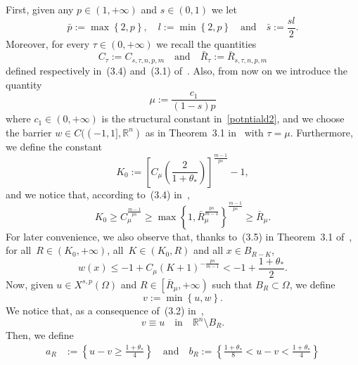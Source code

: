 \documentclass[12pt]{article}
\newcommand{\R}{\mathbb{R}}
\numberwithin{equation}{section}
\renewcommand{\leq}{\leqslant}
\renewcommand{\geq}{\geqslant}
\begin{document}
First, given any $p\in (1,+\infty)$ and $s\in (0,1)$ we let
\begin{equation}\label{holeo}
\bar{p}:=\max\left\lbrace 2,p \right\rbrace,\quad l:=\min\left\lbrace 2,p \right\rbrace\quad\mbox{and}\quad \bar{s}:=\frac{sl}{2}.
\end{equation}
Moreover, for every $\tau\in (0,+\infty)$ we recall the quantities 
\begin{equation}\label{latuse-invefr43}
C_\tau:=C_{s,\tau,n,p,m}\quad\mbox{and}\quad \bar{R}_{\tau}:=\bar{R}_{s,\tau,n,p,m}
\end{equation} 
defined respectively in~(3.4) and~(3.1) of~\cite{DFVERPP}. Also, from now on we introduce the quantity 
\begin{equation}\label{muuuuuuu}
\mu:=\frac{c_1}{(1-s)p}
\end{equation} 
where $c_1\in (0,+\infty)$ is the structural constant in~\eqref{potntiald2}, and we choose the barrier $w\in C((-1,1],\R^n)$ as in Theorem~3.1 in~\cite{DFVERPP} with $\tau=\mu$. Furthermore, we define the constant 
\begin{equation*}
K_0:=\left[C_\mu\left(\frac{2}{1+\theta_*}\right)\right]^{\frac{m-1}{ps}}-1, 
\end{equation*} 
and we notice that, according to~(3.4) in~\cite{DFVERPP},
\begin{equation}\label{KpgrdiR}
K_0\geq C_\mu^\frac{m-1}{ps}\geq \max\left\lbrace 1, \bar{R}_\mu^{\frac{ps}{m-1}}\right\rbrace^\frac{m-1}{ps}\geq \bar{R}_\mu.
\end{equation}
For later convenience, we also observe that, thanks to~(3.5) in Theorem~3.1 of~\cite{DFVERPP}, for all~$R\in(K_0,+\infty)$, all~$K\in (K_0,R)$ and all $x\in B_{R-K}$,
\begin{equation}\label{ukulele}
w(x)\leq -1+C_\mu(K+1)^{-\frac{ps}{m-1}}<-1+\frac{1+\theta_*}{2}.
\end{equation} 
Now, given $u\in X^{s,p}(\Omega)$ and $R\in \left[\bar{R}_\mu,+\infty\right)$ such that $B_R\subset \Omega$, we define 
\begin{equation}\label{vdefini-tion}
v:=\min\left\lbrace u,w \right\rbrace.
\end{equation} 
We notice that, as a consequence of~(3.2) in~\cite{DFVERPP}, 
\begin{equation}\label{eq:boundcond}
v\equiv u \quad\mbox{in}\quad \R^n \setminus  B_R.
\end{equation}
Then, we define
\begin{equation}\label{adierre}
\begin{split}
a_R&:=\left\lbrace u-v\geq \frac{1+\theta_*}{4} \right\rbrace\quad\mbox{and}\quad b_R:= \left\lbrace  \frac{1+\theta_*}{8}<u-v<\frac{1+\theta_*}{4}\right\rbrace
\end{split}
\end{equation}
\end{document}
